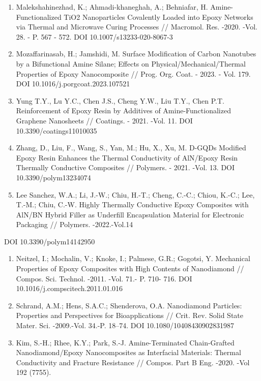 \begin{references}
\begin{enumerate}
\def\labelenumi{\arabic{enumi}.}
\setcounter{enumi}{12}
\item
  Malekshahinezhad, K.; Ahmadi-khaneghah, A.; Behniafar, H.
  Amine-Functionalized TiO2 Nanoparticles Covalently Loaded into Epoxy
  Networks via Thermal and Microwave Curing Processes // Macromol. Res.
  -2020. -Vol. 28. - P. 567 - 572. DOI 10.1007/s13233-020-8067-3
\item
  Mozaffarinasab, H.; Jamshidi, M. Surface Modification of Carbon
  Nanotubes by a Bifunctional Amine Silane; Effects on
  Physical/Mechanical/Thermal Properties of Epoxy Nanocomposite // Prog.
  Org. Coat. - 2023. - Vol. 179. DOI 10.1016/j.porgcoat.2023.107521
\item
  Yung T.Y., Lu Y.C., Chen J.S., Cheng Y.W., Liu T.Y., Chen P.T.
  Reinforcement of Epoxy Resin by Additives of Amine-Functionalized
  Graphene Nanosheets // Coatings. - 2021. -Vol. 11. DOI
  10.3390/coatings11010035
\item
  Zhang, D., Liu, F., Wang, S., Yan, M.; Hu, X., Xu, M. D-GQDs Modified
  Epoxy Resin Enhances the Thermal Conductivity of AlN/Epoxy Resin
  Thermally Conductive Composites // Polymers. - 2021. -Vol. 13. DOI
  10.3390/polym13234074
\item
  Lee Sanchez, W.A.; Li, J.-W.; Chiu, H.-T.; Cheng, C.-C.; Chiou, K.-C.;
  Lee, T.-M.; Chiu, C.-W. Highly Thermally Conductive Epoxy Composites
  with AlN/BN Hybrid Filler as Underfill Encapsulation Material for
  Electronic Packaging // Polymers. -2022.-Vol.14
\end{enumerate}

DOI 10.3390/polym14142950

\begin{enumerate}
\def\labelenumi{\arabic{enumi}.}
\setcounter{enumi}{17}
\item
  Neitzel, I.; Mochalin, V.; Knoke, I.; Palmese, G.R.; Gogotsi, Y.
  Mechanical Properties of Epoxy Composites with High Contents of
  Nanodiamond // Compos. Sci. Technol. -2011. -Vol. 71.- P. 710- 716.
  DOI 10.1016/j.compscitech.2011.01.016
\item
  Schrand, A.M.; Hens, S.A.C.; Shenderova, O.A. Nanodiamond Particles:
  Properties and Perspectives for Bioapplications // Crit. Rev. Solid
  State Mater. Sci. -2009.-Vol. 34.-P. 18--74. DOI
  10.1080/10408430902831987
\item
  Kim, S.-H.; Rhee, K.Y.; Park, S.-J. Amine-Terminated Chain-Grafted
  Nanodiamond/Epoxy Nanocomposites as Interfacial Materials: Thermal
  Conductivity and Fracture Resistance // Compos. Part B Eng. -2020.
  -Vol 192 (7755).
\end{enumerate}


\end{references}

